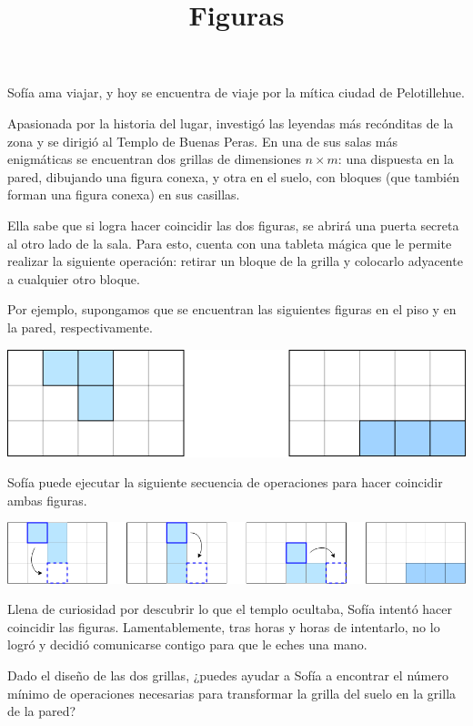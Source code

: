 \documentclass{oci}
\title{Figuras}
\begin{document}
\begin{problemDescription}
Sofía ama viajar, y hoy se encuentra de viaje por la mítica ciudad de Pelotillehue.

Apasionada por la historia del lugar, investigó las leyendas más recónditas de la zona y se dirigió al Templo de Buenas Peras. En una de sus salas más enigmáticas se encuentran dos grillas de dimensiones $n \times m$: una dispuesta en la pared, dibujando una figura conexa, y otra en el suelo, con bloques (que también forman una figura conexa) en sus casillas.

Ella sabe que si logra hacer coincidir las dos figuras, se abrirá una puerta secreta al otro lado de la sala. Para esto, cuenta con una tableta mágica que le permite realizar la siguiente operación: retirar un bloque de la grilla y colocarlo adyacente a cualquier otro bloque.

Por ejemplo, supongamos que se encuentran las siguientes figuras en el piso y en la pared, respectivamente.

\begin{center}
    \includegraphics[scale=0.7]{figura1.png}
\end{center}

Sofía puede ejecutar la siguiente secuencia de operaciones para hacer coincidir ambas figuras.

\begin{center}
    \includegraphics[scale=0.5]{figurras2.png}
\end{center}

Llena de curiosidad por descubrir lo que el templo ocultaba, Sofía intentó hacer coincidir las figuras. Lamentablemente, tras horas y horas de intentarlo, no lo logró y decidió comunicarse contigo para que le eches una mano.

Dado el diseño de las dos grillas, ¿puedes ayudar a Sofía a encontrar el número mínimo de operaciones necesarias para transformar la grilla del suelo en la grilla de la pared?

\end{problemDescription}
\end{document}
